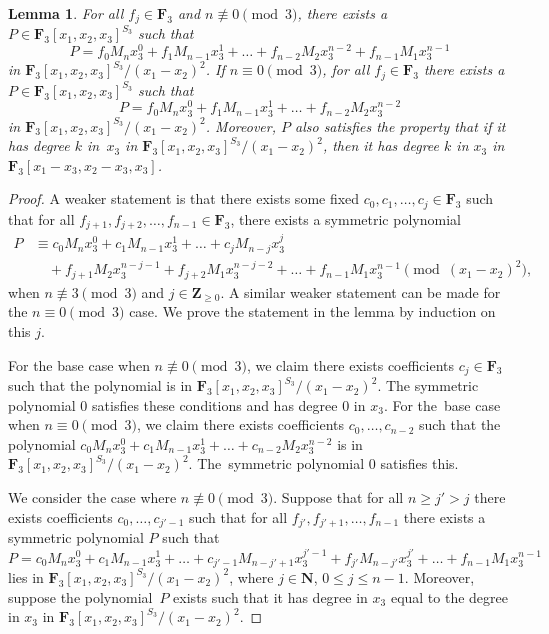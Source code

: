 \documentclass[pdftex]{sigma}
\newtheorem{Lemma}[Theorem]{Lemma}
\theoremstyle{definition}
\numberwithin{equation}{section}
\begin{document}
\begin{Lemma}\label{symAll}
 For all $f_j\in \mathbf{F}_3$ and $n\not\equiv 0\pmod{3}$, there exists a $P\in \mathbf{F}_3[x_1,x_2,x_3]^{S_3}$ such that
 \[P= f_0M_nx_3^0+f_1M_{n-1}x_3^1+\dots + f_{n-2}M_2x_3^{n-2}+f_{n-1}M_1x_3^{n-1}\]
 in $\mathbf{F}_3[x_1,x_2,x_3]^{S_3}/(x_1-x_2)^2$. If $n\equiv 0\pmod{3}$, for all $f_j\in \mathbf{F}_3$ there exists a $P\in \mathbf{F}_3[x_1,x_2,x_3]^{S_3}$ such that
 \[P= f_0M_nx_3^0+f_1M_{n-1}x_3^1+\dots + f_{n-2}M_2x_3^{n-2}\]
 in $\mathbf{F}_3[x_1,x_2,x_3]^{S_3}/(x_1-x_2)^2$. Moreover, $P$ also satisfies the property that if it has degree $k$ in~$x_3$ in $\mathbf{F}_3[x_1,x_2,x_3]^{S_3}/(x_1-x_2)^2$, then it has degree $k$ in $x_3$ in $\mathbf{F}_3[x_1-x_3,x_2-x_3,x_3]$.
\end{Lemma}
\begin{proof}
 A weaker statement is that there exists some fixed $c_0, c_1, \dots, c_j\in\mathbf{F}_3$ such that for all $f_{j+1},f_{j+2},\dots,f_{n-1}\in \mathbf{F}_3$, there exists a symmetric polynomial
 \begin{align*}
 P&\equiv c_0M_nx_3^0+c_1M_{n-1}x_3^1+\dots + c_jM_{n-j}x_3^j\\
 &\quad +f_{j+1}M_2x_3^{n-j-1}+f_{j+2}M_1x_3^{n-j-2}+\dots+ f_{n-1}M_1x_3^{n-1}\pmod{(x_1-x_2)^2},
 \end{align*}
 when $n\not\equiv 3\pmod{3}$ and $j\in \mathbf{Z}_{\geq 0}$. A similar weaker statement can be made for the $n\equiv 0\pmod{3}$ case. We prove the statement in the lemma by induction on this $j$.

 For the base case when $n\not\equiv 0\pmod{3}$, we claim there exists coefficients $c_j\in \mathbf{F}_3$ such that the polynomial  is in $\mathbf{F}_3[x_1,x_2,x_3]^{S_3}/(x_1-x_2)^2$. The symmetric polynomial $0$ satisfies these conditions and has degree $0$ in $x_3$. For the~base case when $n\equiv 0\pmod{3}$, we claim there exists coefficients $c_0,\dots,c_{n-2}$ such that the polynomial $c_0M_nx_3^0+c_1M_{n-1}x_3^1+\dots + c_{n-2}M_2x_3^{n-2}$ is in $\mathbf{F}_3[x_1,x_2,x_3]^{S_3}/(x_1-x_2)^2$. The~symmetric polynomial $0$ satisfies this.

 We consider the case where $n\not\equiv 0\pmod{3}$. Suppose that for all $n\geq j'>j$ there exists coefficients $c_0,\dots,c_{j'-1}$ such that for all $f_{j'},f_{j'+1},\dots, f_{n-1}$ there exists a symmetric polynomial $P$ such that
 \[P = c_0M_nx_3^0+c_1M_{n-1}x_3^1+\dots + c_{j'-1}M_{n-j'+1}x_3^{j'-1}+f_{j'}M_{n-j'}x_3^{j'}+\dots + f_{n-1}M_1x_3^{n-1}\]
 lies in $\mathbf{F}_3[x_1,x_2,x_3]^{S_3}/(x_1-x_2)^2$, where $j\in \mathbf{N}$, $0\leq j\leq n-1$. Moreover, suppose the polynomial~$P$ exists such that it has degree in $x_3$ equal to the degree in $x_3$ in $\mathbf{F}_3[x_1,x_2,x_3]^{S_3}/(x_1-x_2)^2$.


\end{proof}
\end{document}
